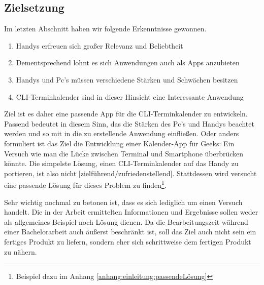 \subsection{Zielsetzung}\label{section:zielsetzung} \myCheckmark

Im letzten Abschnitt haben wir folgende Erkenntnisse gewonnen.
\begin{enumerate}
	\item Handys erfreuen sich großer Relevanz und Beliebtheit
	\item Dementsprechend lohnt es sich Anwendungen auch als Apps anzubieten
	\item Handys und Pc's müssen verschiedene Stärken und Schwächen besitzen
	\item CLI-Terminkalender sind in dieser Hinsicht eine Interessante Anwendung
\end{enumerate}

\myNewSection
Ziel ist es daher eine passende App für die CLI-Terminkalender zu entwickeln. Passend bedeutet in diesem Sinn, das die Stärken des Pc's und Handys beachtet werden und so mit in die zu erstellende Anwendung einfließen.\newline%
Oder anders formuliert ist das Ziel die \glqq Entwicklung einer Kalender-App für Geeks: Ein Versuch wie man die Lücke zwischen Terminal und Smartphone überbrücken könnte\grqq{}.\newline%
Die simpelste Lösung, einen CLI-Terminkalender auf das Handy zu portieren, ist also nicht [zielführend/zufriedenstellend]. Stattdessen wird versucht eine passende Lösung für dieses Problem zu finden\footnote{Beispiel dazu im Anhang \ref{anhang:einleitung:passendeLösung}}.

\myNewSection
Sehr wichtig nochmal zu betonen ist, dass es sich lediglich um einen Versuch handelt. Die in der Arbeit ermittelten Informationen und Ergebnisse sollen weder als allgemeines Beispiel noch Lösung dienen.\newline%
Da die Bearbeitungszeit während einer Bachelorarbeit auch äußerst beschränkt ist, soll das Ziel auch nicht sein ein fertiges Produkt zu liefern, sondern eher sich schrittweise dem fertigen Produkt zu nähern.


